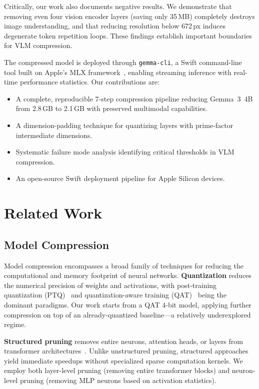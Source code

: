 \documentclass[11pt]{article}
\begin{document}
Critically, our work also documents negative results. We demonstrate that removing even four vision encoder layers (saving only 35\,MB) completely destroys image understanding, and that reducing resolution below 672\,px induces degenerate token repetition loops. These findings establish important boundaries for VLM compression.

The compressed model is deployed through \texttt{gemma-cli}, a Swift command-line tool built on Apple's MLX framework~\citep{mlx}, enabling streaming inference with real-time performance statistics. Our contributions are:

\begin{itemize}[leftmargin=*]
    \item A complete, reproducible 7-step compression pipeline reducing Gemma~3~4B from 2.8\,GB to 2.1\,GB with preserved multimodal capabilities.
    \item A dimension-padding technique for quantizing layers with prime-factor intermediate dimensions.
    \item Systematic failure mode analysis identifying critical thresholds in VLM compression.
    \item An open-source Swift deployment pipeline for Apple Silicon devices.
\end{itemize}

\section{Related Work}
\label{sec:related}

\subsection{Model Compression}

Model compression encompasses a broad family of techniques for reducing the computational and memory footprint of neural networks. \textbf{Quantization} reduces the numerical precision of weights and activations, with post-training quantization (PTQ)~\citep{gptq,awq} and quantization-aware training (QAT)~\citep{qat} being the dominant paradigms. Our work starts from a QAT 4-bit model, applying further compression on top of an already-quantized baseline---a relatively underexplored regime.

\textbf{Structured pruning} removes entire neurons, attention heads, or layers from transformer architectures~\citep{structuredpruning,layerpruning}. Unlike unstructured pruning, structured approaches yield immediate speedups without specialized sparse computation kernels. We employ both layer-level pruning (removing entire transformer blocks) and neuron-level pruning (removing MLP neurons based on activation statistics).
\end{document}
